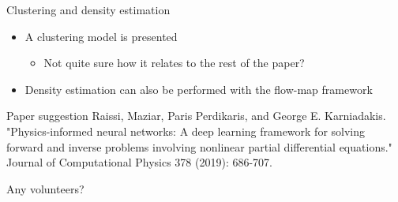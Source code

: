 \documentclass[presentation]{beamer}
\begin{document}
\begin{frame}[label={sec:orgdcfaac9}]{Clustering and density estimation}
\begin{itemize}
\item A clustering model is presented
\begin{itemize}
\item Not quite sure how it relates to the rest of the paper?
\end{itemize}
\end{itemize}
\vfill
\begin{itemize}
\item Density estimation can also be performed with the flow-map framework
\end{itemize}
\end{frame}

\begin{frame}[label={sec:orgbb47720}]{Paper suggestion}
Raissi, Maziar, Paris Perdikaris, and George E. Karniadakis. "Physics-informed neural networks: A deep learning framework for solving forward and inverse problems involving nonlinear partial differential equations." Journal of Computational Physics 378 (2019): 686-707.
\vfill

Any volunteers?
\end{frame}
\end{document}
